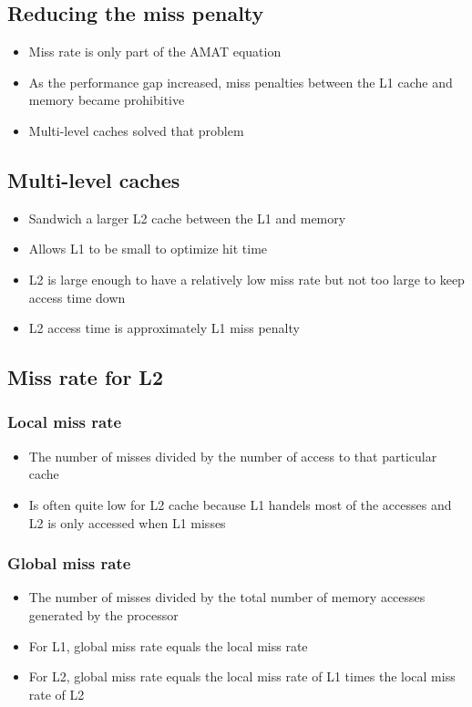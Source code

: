 \documentclass[11pt]{article}
\begin{document}
\subsection {Reducing the miss penalty}
    \begin{itemize}
        \item Miss rate is only part of the AMAT equation
        \item As the performance gap increased, miss penalties between the L1 cache and memory became prohibitive
        \item Multi-level caches solved that problem
    \end{itemize}

\subsection{Multi-level caches}
    \begin{itemize}
        \item Sandwich a larger L2 cache between the L1 and memory
        \item Allows L1 to be small to optimize hit time
        \item L2 is large enough to have a relatively low miss rate but not too large to keep access time down
        \item L2 access time is approximately L1 miss penalty
    \end{itemize}

\subsection{Miss rate for L2}
\subsubsection {Local miss rate}
    \begin{itemize}
        \item The number of misses divided by the number of access to that particular cache
        \item Is often quite low for L2 cache because L1 handels most of the accesses and L2 is only accessed when L1 misses
    \end{itemize}
\subsubsection {Global miss rate}
    \begin{itemize}
        \item The number of misses divided by the total number of memory accesses generated by the processor
        \item For L1, global miss rate equals the local miss rate
        \item For L2, global miss rate equals the local miss rate of L1 times the local miss rate of L2
    \end{itemize}
\end{document}
